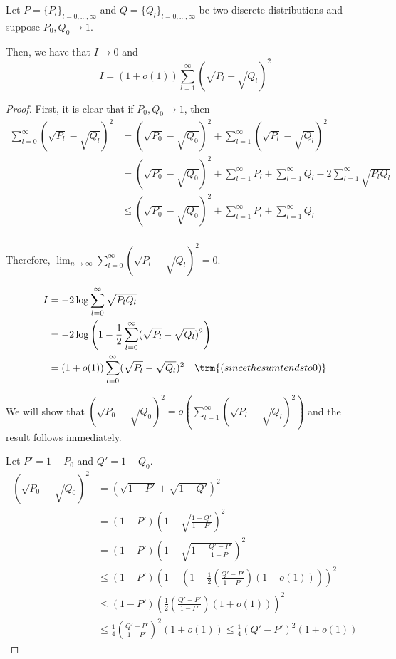 \documentclass{article}
\begin{document}
\begin{lemma}
\label{lem:simplify_renyi}
Let $P = \{ P_l \}_{l = 0,..., \infty}$ and $Q = \{ Q_l \}_{l=0,...,\infty}$ be two discrete distributions and suppose $P_0, Q_0 \rightarrow 1$. 

Then, we have that $I \rightarrow 0$ and 
\[
I = (1 + o(1)) \sum_{l = 1}^\infty (\sqrt{P_l} - \sqrt{Q_l})^2 
\]

\end{lemma}

\begin{proof}
First, it is clear that if $P_0, Q_0 \rightarrow 1$, then 
\begin{align*}
\sum_{l=0}^\infty (\sqrt{P_l} - \sqrt{Q_l})^2 &= 
   (\sqrt{P_0} - \sqrt{Q_0})^2 + \sum_{l=1}^\infty (\sqrt{P_l} - \sqrt{Q_l})^2 \\
 &= (\sqrt{P_0} - \sqrt{Q_0})^2 + \sum_{l=1}^\infty P_l + \sum_{l=1}^\infty Q_l - 
  2 \sum_{l=1}^\infty \sqrt{P_l Q_l} \\
 &\leq  (\sqrt{P_0} - \sqrt{Q_0})^2 + \sum_{l=1}^\infty P_l + \sum_{l=1}^\infty Q_l \\
\end{align*}

Therefore, $\lim_{n\rightarrow \infty} \sum_{l=0}^\infty (\sqrt{P_l} - \sqrt{Q_l})^2 = 0$. 

\begin{align*}
I &= -2 \log \sum_{l=0}^\infty \sqrt{P_l Q_l} \\
  &= -2 \log \left( 1 - \frac{1}{2} \sum_{l=0}^\infty (\sqrt{P_l} - \sqrt{Q_l})^2 \right) \\ 
  &= (1 + o(1)) \sum_{l=0}^\infty (\sqrt{P_l} - \sqrt{Q_l})^2 \quad \trm{(since the sum tends to 0)}
\end{align*}

We will show that $(\sqrt{P_0} - \sqrt{Q_0})^2 = o \left( \sum_{l=1}^\infty (\sqrt{P_l} - \sqrt{Q_l} )^2 \right)$ and the result follows immediately.

Let $P' = 1 - P_0$ and $Q' = 1 - Q_0$. 
\begin{align*}
(\sqrt{P_0} - \sqrt{Q_0})^2 &= (\sqrt{1-P'} + \sqrt{1-Q'})^2 \\
  &= (1-P') \left( 1 - \sqrt{ \frac{1-Q'}{1-P'}} \right)^2 \\
 &= (1-P') \left( 1 - \sqrt{ 1 - \frac{Q' - P'}{1 - P'} } \right)^2 \\
 &\leq (1-P') \left( 1 - (1 - \frac{1}{2} \left( \frac{Q' - P'}{1 - P'} \right) (1+o(1)) ) \right)^2 \\
 &\leq (1 - P') \left( \frac{1}{2} \left( \frac{Q'-P'}{1-P'} \right) (1+o(1)) \right)^2 \\
 &\leq \frac{1}{4} \left( \frac{Q' - P'}{1 - P'} \right)^2 (1 + o(1)) \leq \frac{1}{4} ( Q' - P')^2 (1 + o(1)) 
\end{align*}


\end{proof}
\end{document}
